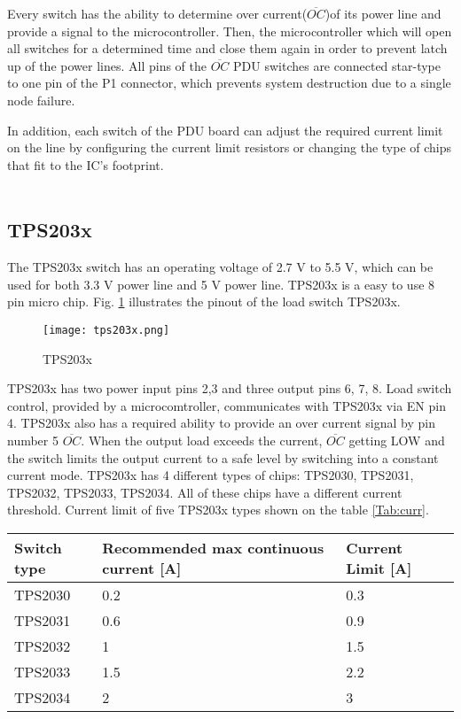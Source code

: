 Every switch has the ability to determine over current($\overline{OC}$)of its power line and provide a signal to the microcontroller. Then, the microcontroller which will open all switches for a determined time and close them again in order to prevent latch up of the power lines. All pins of the $ \overline {OC} $ PDU switches are connected star-type to one pin of the P1 connector, which prevents system destruction due to a single node failure.

In addition, each switch of the PDU board can adjust the required current limit on the line by configuring the current limit resistors or changing the type of chips that fit to the IC's footprint.    
  \\ \\
\subsection{TPS203x }
The TPS203x switch has an operating voltage of 2.7 V to 5.5 V, which can be used for both 3.3 V power line and 5 V power line. TPS203x is a easy to use 8 pin micro chip. Fig. \ref{fig: PDU332} illustrates the pinout of the load switch TPS203x.

\begin{figure}[h]
	\centering
	\texttt{[image: tps203x.png]}
	\caption{TPS203x \cite{26}}
	\label{fig: PDU332}
\end{figure} 

TPS203x has  two power input pins 2,3 and three output pins 6, 7, 8. Load switch control, provided by a microcomtroller, communicates with TPS203x via EN pin 4. TPS203x also has a required ability to provide an over current signal by pin number 5 $\overline{OC}$. \cite{26} When the output load exceeds the current, $\overline{OC}$ getting LOW and the switch limits the output current to a safe level by switching into a constant current mode. TPS203x has 4 different types of chips: TPS2030, TPS2031, TPS2032, TPS2033, TPS2034. All of these chips have a different current threshold. Current limit of five TPS203x types shown on the table \ref{Tab:curr}.\\

\begin{tabular}{p{4cm}p{5cm}p{4cm}} \toprule
	Switch type & Recommended max continuous  current [A] & Current Limit [A]\\ \midrule
	TPS2030 & 0.2 & 0.3\\
	TPS2031 & 0.6 & 0.9\\
	TPS2032 & 1 & 1.5\\
	TPS2033 & 1.5 & 2.2 \\
	TPS2034 & 2 & 3 \\
	
	\bottomrule
	
\end{tabular}\\ \\ \\ \\
\label{Tab:curr}

